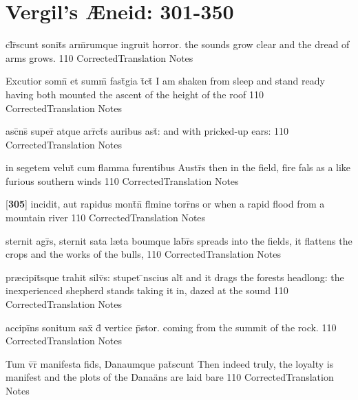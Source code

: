 \section{Vergil's {\AE}neid: 301-350} %

\latline
  {cl\={}r\={}scunt sonit\={}s arm\={}rumque ingruit horror.}
  { the sounds grow clear and the dread of arms grows. }
  {110}
  { CorrectedTranslation }
  { Notes }


\latline
  {Excutior somn\={} et summ\={\macron {\i}} fast\={\macron {\i}}gia t\={}ct\={\macron {\i}}}
  { I am shaken from sleep and stand ready having both mounted the ascent of the height of the roof  }
  {110}
  { CorrectedTranslation }
  { Notes }


\latline
  {asc\={}ns\={} super\={} atque arr\={}ct\={\macron {\i}}s auribus ast\={}:}
  { and with pricked-up ears: }
  {110}
  { CorrectedTranslation }
  { Notes }


\latline
  {in segetem velut\={\macron {\i}} cum flamma furentibus Austr\={\macron {\i}}s}
  { then in the field, fire fals as a like furious southern winds }
  {110}
  { CorrectedTranslation }
  { Notes }


\latline
  {[\textbf{305}] incidit, aut rapidus mont\={}n\={} fl\={}mine torr\={}ns}
  { or when a rapid flood from a mountain river }
  {110}
  { CorrectedTranslation }
  { Notes }


\latline
  {sternit agr\={}s, sternit sata l{\ae}ta boumque lab\={}r\={}s}
  { spreads into the fields, it flattens the crops and the works of the bulls,  }
  {110}
  { CorrectedTranslation }
  { Notes }


\latline
  {pr{\ae}cipit\={\macron {\i}}sque trahit silv\={}s: stupet \={\macron {\i}}nscius alt\={}}
  { and it drags the forests headlong: the inexperienced shepherd stands taking it in, dazed at the sound   }
  {110}
  { CorrectedTranslation }
  { Notes }


\latline
  {accipi\={}ns sonitum sax\={\macron {\i}} d\={} vertice p\={}stor.}
  { coming from the summit of the rock. }
  {110}
  { CorrectedTranslation }
  { Notes }


\latline
  {Tum v\={}r\={} manifesta fid\={}s, Danaumque pat\={}scunt}
  { Then indeed truly, the loyalty is manifest and the plots of the Dana\"ans are laid bare }
  {110}
  { CorrectedTranslation }
  { Notes }


